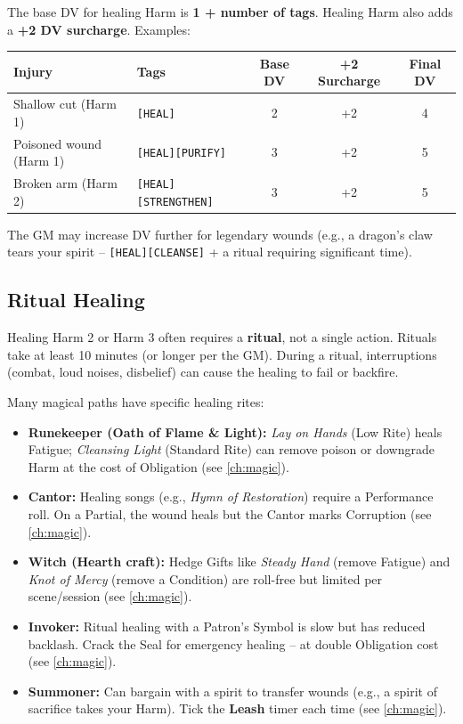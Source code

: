 The base DV for healing Harm is \textbf{1 + number of tags}. Healing Harm also adds a \textbf{+2 DV surcharge}. Examples:

\begin{center}
\begin{tabular}{llccc}
\toprule
\textbf{Injury} & \textbf{Tags} & \textbf{Base DV} & \textbf{+2 Surcharge} & \textbf{Final DV} \\
\midrule
Shallow cut (Harm 1) & \texttt{[HEAL]} & 2 & +2 & 4 \\
Poisoned wound (Harm 1) & \texttt{[HEAL][PURIFY]} & 3 & +2 & 5 \\
Broken arm (Harm 2) & \texttt{[HEAL][STRENGTHEN]} & 3 & +2 & 5 \\
\bottomrule
\end{tabular}
\end{center}

The GM may increase DV further for legendary wounds (e.g., a dragon's claw tears your spirit -- \texttt{[HEAL][CLEANSE]} + a ritual requiring significant time).

\subsection{Ritual Healing}
\label{subsec:ritual-healing}

Healing Harm 2 or Harm 3 often requires a \textbf{ritual}, not a single action. Rituals take at least 10 minutes (or longer per the GM). During a ritual, interruptions (combat, loud noises, disbelief) can cause the healing to fail or backfire.

Many magical paths have specific healing rites:
\begin{itemize}
  \item \textbf{Runekeeper (Oath of Flame \& Light):} \textit{Lay on Hands} (Low Rite) heals Fatigue; \textit{Cleansing Light} (Standard Rite) can remove poison or downgrade Harm at the cost of Obligation (see \ref{ch:magic}).
  \item \textbf{Cantor:} Healing songs (e.g., \textit{Hymn of Restoration}) require a Performance roll. On a Partial, the wound heals but the Cantor marks Corruption (see \ref{ch:magic}).
  \item \textbf{Witch (Hearth craft):} Hedge Gifts like \textit{Steady Hand} (remove Fatigue) and \textit{Knot of Mercy} (remove a Condition) are roll-free but limited per scene/session (see \ref{ch:magic}).
  \item \textbf{Invoker:} Ritual healing with a Patron's Symbol is slow but has reduced backlash. Crack the Seal for emergency healing -- at double Obligation cost (see \ref{ch:magic}).
  \item \textbf{Summoner:} Can bargain with a spirit to transfer wounds (e.g., a spirit of sacrifice takes your Harm). Tick the \textbf{Leash} timer each time (see \ref{ch:magic}).
\end{itemize}

